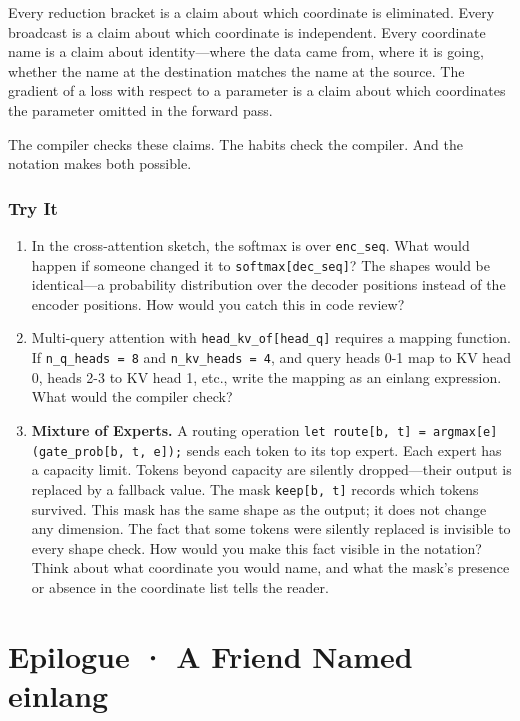\documentclass[11pt,]{article}
\begin{document}
Every reduction bracket is a claim about which coordinate is eliminated.
Every broadcast is a claim about which coordinate is independent. Every
coordinate name is a claim about identity---where the data came from,
where it is going, whether the name at the destination matches the name
at the source. The gradient of a loss with respect to a parameter is a
claim about which coordinates the parameter omitted in the forward pass.

The compiler checks these claims. The habits check the compiler. And the
notation makes both possible.

\hypertarget{try-it-15}{%
\subsubsection{Try It}\label{try-it-15}}

\begin{enumerate}
\def\labelenumi{\arabic{enumi}.}
\item
  In the cross-attention sketch, the softmax is over \texttt{enc\_seq}.
  What would happen if someone changed it to
  \texttt{softmax{[}dec\_seq{]}}? The shapes would be identical---a
  probability distribution over the decoder positions instead of the
  encoder positions. How would you catch this in code review?
\item
  Multi-query attention with \texttt{head\_kv\_of{[}head\_q{]}} requires
  a mapping function. If \texttt{n\_q\_heads\ =\ 8} and
  \texttt{n\_kv\_heads\ =\ 4}, and query heads 0-1 map to KV head 0,
  heads 2-3 to KV head 1, etc., write the mapping as an einlang
  expression. What would the compiler check?
\item
  \textbf{Mixture of Experts.} A routing operation
  \texttt{let\ route{[}b,\ t{]}\ =\ argmax{[}e{]}(gate\_prob{[}b,\ t,\ e{]});}
  sends each token to its top expert. Each expert has a capacity limit.
  Tokens beyond capacity are silently dropped---their output is replaced
  by a fallback value. The mask \texttt{keep{[}b,\ t{]}} records which
  tokens survived. This mask has the same shape as the output; it does
  not change any dimension. The fact that some tokens were silently
  replaced is invisible to every shape check. How would you make this
  fact visible in the notation? Think about what coordinate you would
  name, and what the mask's presence or absence in the coordinate list
  tells the reader.
\end{enumerate}

\newpage

\hypertarget{epilogue-a-friend-named-einlang}{%
\section{Epilogue · A Friend Named
einlang}\label{epilogue-a-friend-named-einlang}}
\end{document}
